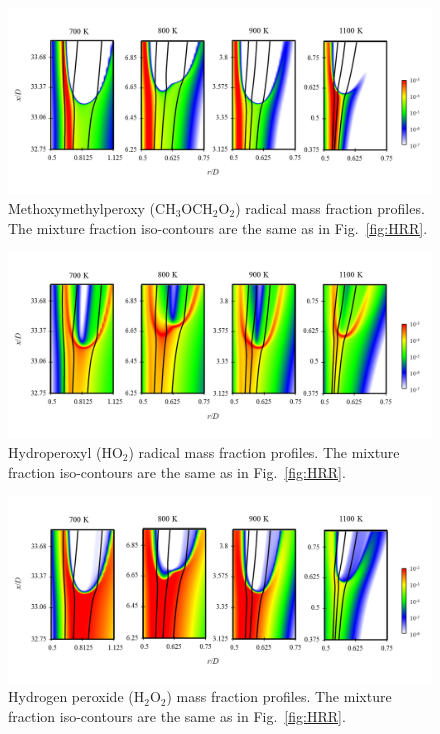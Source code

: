 \documentclass[review,3p,times]{elsarticle}
\begin{document}
\begin{figure}[t]
  \centering
  \scriptsize
  \vspace{-0.1in}
  \includegraphics[width=1.0\textwidth]{RO2.png}
  \normalsize
  \vspace{-0.1in}
  \caption{Methoxymethylperoxy (CH$_3$OCH$_2$O$_2$) radical mass fraction profiles.  The mixture fraction iso-contours are the same as in Fig.~\ref{fig:HRR}.}
  \label{fig:RO2}
\end{figure}

\begin{figure}[t]
  \centering
  \scriptsize
  \vspace{-0.1in}
  \includegraphics[width=1.0\textwidth]{HO2.png}
  \normalsize
  \vspace{-0.1in}
  \caption{Hydroperoxyl (HO$_2$) radical mass fraction profiles.  The mixture fraction iso-contours are the same as in Fig.~\ref{fig:HRR}.}
  \label{fig:HO2}
\end{figure}

\begin{figure}[t]
  \centering
  \scriptsize
  \vspace{-0.1in}
  \includegraphics[width=1.0\textwidth]{H2O2.png}
  \normalsize
  \vspace{-0.1in}
  \caption{Hydrogen peroxide (H$_2$O$_2$) mass fraction profiles.  The mixture fraction iso-contours are the same as in Fig.~\ref{fig:HRR}.}
  \label{fig:H2O2}
\end{figure}
\end{document}
